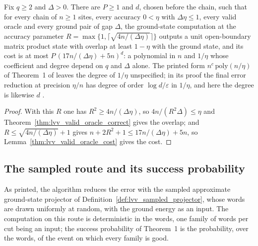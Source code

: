 \begin{theorem}
    \label{thm:lvv_theorem_one_accuracy}
    \leanok
    Fix $q\ge2$ and $\Delta>0$. There are $P\ge1$ and $d$, chosen before the
    chain, such that for every chain of $n\ge1$ sites, every accuracy
    $0<\eta$ with $\Delta\eta\le1$, every valid oracle and every ground pair of
    gap $\Delta$, the ground-state computation at the accuracy parameter
    $R=\max\{1,\lceil\sqrt{4n/(\Delta\eta)}\rceil\}$ outputs a unit open-boundary
    matrix product state with overlap at least $1-\eta$ with the ground state,
    and its cost is at most $P\,(17n/(\Delta\eta)+5n)^d$: a polynomial in $n$
    and $1/\eta$ whose coefficient and degree depend on $q$ and $\Delta$ alone.
    The printed form $n^{c}\,\mathrm{poly}(n/\eta)$ of Theorem~1 of
    \cite{Landau2015Polynomial} leaves the degree of $1/\eta$ unspecified; in
    its proof the final error reduction at precision $\eta/n$ has degree of
    order $\log d/\varepsilon$ in $1/\eta$, and here the degree is likewise $d$
    \cite{gap:lvv13_cost_model}.
\end{theorem}
\begin{proof}
    \leanok
    With this $R$ one has $R^2\ge4n/(\Delta\eta)$, so $4n/(R^2\Delta)\le\eta$
    and Theorem~\ref{thm:lvv_valid_oracle_correct} gives the overlap; and
    $R\le\sqrt{4n/(\Delta\eta)}+1$ gives $n+2R^2+1\le17n/(\Delta\eta)+5n$, so
    Lemma~\ref{thm:lvv_valid_oracle_cost} gives the cost.
\end{proof}

\subsection{The sampled route and its success probability}
\label{sec:lvv_sampled_program}

As printed, the algorithm reduces the error with the sampled approximate
ground-state projector of Definition~\ref{def:lvv_sampled_projector}, whose
words are drawn uniformly at random, with the ground energy as an input. The
computation on this route is deterministic in the words, one family of words
per cut being an input; the success probability of Theorem~1 is the probability,
over the words, of the event on which every family is good.

